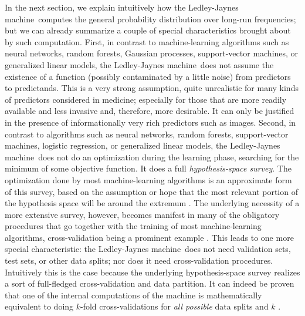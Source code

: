 \documentclass[utf8]{FrontiersinHarvard} %
\newcommand*{\pencil}{{\fontencoding{U}\fontfamily{fontawesometwo}\selectfont\symbol{210}}}
\newcommand{\mynotep}[1]{{\color{notecolour}\pencil\ #1}}
\newcommand*{\sect}{\S}%
\newcommand*{\sects}{\S\S}%
\newcommand*{\chap}{ch.}%
\renewcommand*{\|}[1][]{\nonscript\:#1\vert\nonscript\:\mathopen{}}
\newcommand*{\ljm}{Ledley-Jaynes machine}
\begin{document}


In the next section, we explain intuitively how the \ljm\ computes the general probability distribution over long-run frequencies; but we can already summarize a couple of special characteristics brought about by such computation. First, in contrast to machine-learning algorithms such as neural networks, random forests, Gaussian processes, support-vector machines, or generalized linear models, the \ljm\ does not assume the existence of a function (possibly contaminated by a little noise) from predictors to predictands. This is a very strong assumption, quite unrealistic for many kinds of predictors considered in medicine; especially for those that are more readily available and less invasive and, therefore, more desirable. It can only be justified in the presence of informationally very rich predictors such as images. Second, in contrast to algorithms such as neural networks, random forests, support-vector machines, logistic regression, or generalized linear models, the \ljm\ does not do an optimization during the learning phase, searching for the minimum of some objective function. It does a full \emph{hypothesis-space survey}. %
The optimization done by most machine-learning algorithms is an approximate form of this survey, based on the assumption or hope that the most relevant portion of the hypothesis space will be around the extremum \citetext{\citealp[\chap~16]{mackay1992,murphy2012}; \citealp[see also][]{selfetal1987}}. The underlying necessity of a more extensive survey, however, becomes manifest in many of the obligatory procedures that go together with the training of most machine-learning algorithms, cross-validation being a prominent example \citep{mackay1992b}. This leads to one more special characteristic: the \ljm\ does not need validation sets, test sets, or other data splits; nor does it need cross-validation procedures. Intuitively this is the case because the underlying hypothesis-space survey realizes a sort of full-fledged cross-validation and data partition. It can indeed be proven that one of the internal computations of the machine is mathematically equivalent to doing $k$-fold cross-validations for \emph{all possible} data splits and $k$ \citep{portamana2019b,fongetal2020}.
\end{document}
